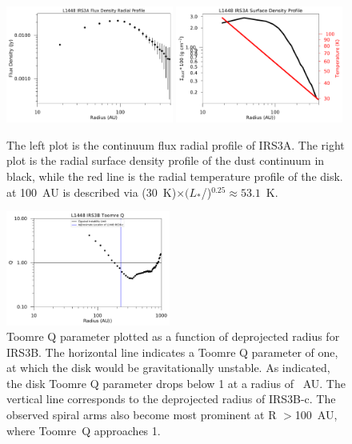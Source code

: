 \begin{figure}[H]
\begin{center}
\includegraphics[width=0.49\textwidth]{img/L1448N-intensity-rad-xsec-cont_robust-05_wide.pdf}
\includegraphics[width=0.49\textwidth]{img/L1448N-surface-density-lograd-xsec-cont_robust-05_wide.pdf}
\end{center}
\caption{The left plot is the continuum flux  radial profile of IRS3A. The right plot is the radial surface density profile of the dust continuum in black, while the red line is the radial temperature profile of the disk.  at 100~AU is described via (30~K)$\times(L_{*}$/\lsun)$^{0.25}\approx53.1$~K.}\label{fig:irs3asurfacedensity}
\end{figure}

\begin{figure}[H]
\begin{center}
\includegraphics[width=0.48\textwidth]{img/L1448N-toomre-Q-linear-xsec-c17o_cont.pdf}
\end{center}   
\caption{Toomre Q parameter plotted as a function of deprojected radius for IRS3B. The horizontal line indicates a Toomre Q parameter of one, at which the disk would be gravitationally unstable. As indicated, the disk Toomre Q parameter drops below 1 at a radius of ~AU. The vertical line corresponds to the deprojected radius of IRS3B-c. The observed spiral arms also become most prominent at R $>$100~AU, where Toomre~Q approaches 1.}\label{fig:irs3btoomreq}
\end{figure}

